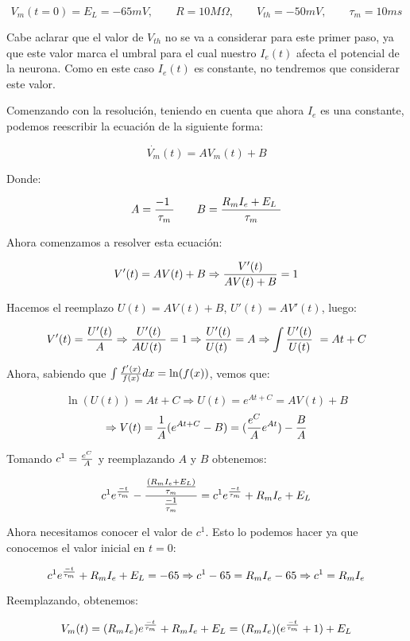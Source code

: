 \documentclass{article}
\begin{document}
\[ V_m(t = 0) = E_L = -65mV, \qquad R = 10 M \Omega, \qquad V_{th} = -50 mV, \qquad \tau_m = 10ms \]

Cabe aclarar que el valor de $ V_{th} $ no se va a considerar para este primer paso, ya que este valor marca el umbral para el cual nuestro $ I_e(t) $ afecta el potencial de la neurona. Como en este caso $ I_e(t) $ es constante, no tendremos que considerar este valor.

Comenzando con la resolución, teniendo en cuenta que ahora $ I_e $ es una constante, podemos reescribir la ecuación de la siguiente forma:

\[ \dot{V_m}(t) = A V_m(t) + B \]

Donde:

\[ A = { {- 1} \over \tau_m } \qquad B = { {R_m I_e + E_L} \over \tau_m } \]


Ahora comenzamos a resolver esta ecuación:

\[ V'(t) = A V(t) + B  \Rightarrow { V'(t) \over {A V(t) + B} } = 1 \]

Hacemos el reemplazo $ U(t) = A V(t) + B $, $ U'(t) = A V'(t) $, luego:

\[ V'(t) = { U'(t) \over A } \Rightarrow { U'(t) \over A U(t) } = 1 \Rightarrow { U'(t) \over U(t) } = A \Rightarrow { \int {U'(t) \over U(t)} } = A t + C \]

Ahora, sabiendo que $ \int { {f'(x) \over f(x)} dx } = \ln (f(x))  $, vemos que:

\[ \ln (U(t)) = A t + C  \Rightarrow U(t) = e^{A t + C} = A V(t) + B \]
\[ \Rightarrow V(t) = {1 \over A} ( e^{At + C} - B ) = ({ e^C \over A }e^{At}) - { B \over A } \]

Tomando $ c^1 = { e^C \over A } $ y reemplazando $ A $ y $ B $ obtenemos:

\[ c^1 e^{-t \over \tau_m } - { {( R_m I_e + E_L ) \over \tau_m } \over {-1 \over \tau_m } } = c^1 e^{-t \over \tau_m } + R_m I_e + E_L \]

Ahora necesitamos conocer el valor de $ c^1 $. Esto lo podemos hacer ya que conocemos el valor inicial en $ t = 0 $:

\[ c^1 e^{ -t \over \tau_m } + R_m I_e + E_L = -65 \Rightarrow c^1 - 65 = R_m I_e - 65 \Rightarrow c^1 = R_m I_e \]

Reemplazando, obtenemos:

\[ V_m(t) = (R_m I_e) e^{-t \over \tau_m} + R_m I_e + E_L = (R_m I_e) (e^{-t \over \tau_m} + 1) + E_L \]
\end{document}
